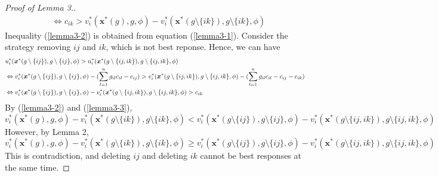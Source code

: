 \documentclass[12pt]{article}
\theoremstyle{definition}
\newcommand{\bm}[1]{\boldsymbol{#1}}
\begin{document}
\begin{proof}[Proof of Lemma 3.]
\begin{align}
			& \Leftrightarrow c_{ik} > v_i^*(\bm{x}^*(g), g, \phi) - v_i^*(\bm{x}^*(g \setminus \{ik\}), g \setminus \{ik\}, \phi)
	\end{align}
	Inequality (\ref{lemma3-2}) is obtained from equation (\ref{lemma3-1}).
	Consider the strategy removing $ij$ and $ik$, which is not best reponse.
	Hence, we can have
	\begin{align}
		\label{lemma3-3}
		& u_i^*(\bm{x}^*(g \setminus \{ij\}), g \setminus \{ij\}, \phi) > u_i^*(\bm{x}^*(g \setminus \{ij,ik\}), g \setminus \{ij,ik\}, \phi) \notag \\
			& \Leftrightarrow v_i^*(\bm{x}^*(g \setminus \{ij\}), g \setminus \{ij\}, \phi) - (\sum_{l=1}^n g_{il} c_{il} - c_{ij}) > v_i^*(\bm{x}^*(g \setminus \{ij,ik\}), g \setminus \{ij,ik\}, \phi) - (\sum_{l=1}^n g_{il} c_{il} - c_{ij} - c_{ik}) \notag \\
			& \Leftrightarrow v_i^*(\bm{x}^*(g \setminus \{ij\}), g \setminus \{ij\}, \phi) - v_i^*(\bm{x}^*(g \setminus \{ij,ik\}), g \setminus \{ij,ik\}, \phi) > c_{ik}
	\end{align}
	By (\ref{lemma3-2}) and (\ref{lemma3-3}),
	\[ v_i^*(\bm{x}^*(g), g, \phi) - v_i^*(\bm{x}^*(g \setminus \{ik\}), g \setminus \{ik\}, \phi) < v_i^*(\bm{x}^*(g \setminus \{ij\}), g \setminus \{ij\}, \phi) - v_i^*(\bm{x}^*(g \setminus \{ij,ik\}), g \setminus \{ij,ik\}, \phi) \]
	However, by Lemma 2,
	\[ v_i^*(\bm{x}^*(g), g, \phi) - v_i^*(\bm{x}^*(g \setminus \{ik\}), g \setminus \{ik\}, \phi) \ge v_i^*(\bm{x}^*(g \setminus \{ij\}), g \setminus \{ij\}, \phi) - v_i^*(\bm{x}^*(g \setminus \{ij,ik\}), g \setminus \{ij,ik\}, \phi) \]
	This is contradiction, and deleting $ij$ and deleting $ik$ cannot be best responses at the same time.
\end{proof}
\end{document}
